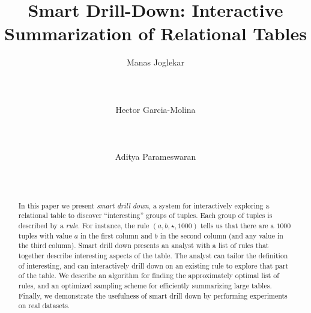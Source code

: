 \documentclass{vldb}
\newcommand{\techreporttext}[1]{}
\begin{document}
\title{Smart Drill-Down: Interactive Summarization of Relational Tables}
\author{
\alignauthor
Manas Joglekar\\
       \\
       \\
	   \\
\alignauthor
Hector Garcia-Molina\\
       \\
       \\
	   \\
\alignauthor 
Aditya Parameswaran\\
       \\
       \\
}
\maketitle

\begin{abstract}
In this paper we present {\em smart drill down},
a system for interactively exploring a relational table
to discover ``interesting'' groups of tuples.
Each group of tuples is described by a {\em rule}.
For instance, the rule $(a, b, \star, 1000)$ tells us that
there are a $1000$ tuples with value $a$ in the first column and $b$
in the second column (and any value in the third column).
Smart drill down presents an analyst with a list of rules that
together describe interesting aspects of the table.
The analyst can tailor the definition of interesting,
and can interactively drill down on an existing rule to
explore that part of the table.
We describe an
algorithm for finding the approximately optimal list of rules, and an optimized
sampling scheme for efficiently summarizing large tables. Finally, we
demonstrate the usefulness of smart drill down by performing experiments on
real datasets.
\end{abstract}









\techreporttext{}



  


\techreporttext{}
\end{document}
